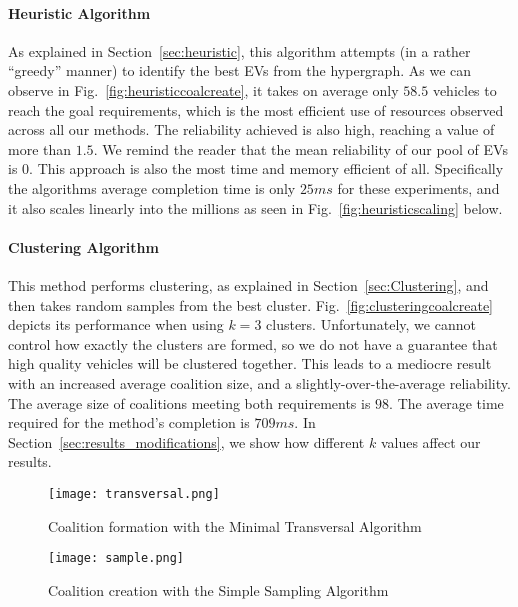 \paragraph{Heuristic Algorithm}
As explained in Section~\ref{sec:heuristic}, this algorithm attempts (in a rather ``greedy'' manner) to identify the best EVs from the hypergraph.	As we can observe in Fig.~\ref{fig:heuristiccoalcreate}, it takes on average only $58.5$ vehicles to reach the goal requirements, which is the most efficient use of resources observed across all our methods. The reliability achieved is also high, reaching a value of more than $1.5$. We remind the reader that the mean reliability of our pool of EVs is $0$. This approach is also the most time and memory efficient of all. Specifically the algorithms average completion time is only $25ms$ for these experiments, and it also scales linearly into the millions as seen in Fig.~\ref{fig:heuristicscaling} below.	
\paragraph{Clustering Algorithm}
This method performs clustering, as explained in Section~\ref{sec:Clustering}, and then takes random samples from the best cluster. Fig.~\ref{fig:clusteringcoalcreate} depicts its performance when using $k=3$ clusters. Unfortunately, we cannot control how exactly the clusters are formed, so we do not have a guarantee that high quality vehicles will be clustered together. This leads to a mediocre result with an increased average coalition size, and a slightly-over-the-average reliability. The average size of coalitions meeting both requirements is $98$. The average time required for the method's completion is $709 ms$. In Section~\ref{sec:results_modifications}, we show how different $k$ values affect our results.
\vspace{-10pt}
\begin{figure}
	\centering
	\begin{minipage}{.5\textwidth}
		\centering
		\texttt{[image: transversal.png]}
		\caption{Coalition formation with the\newline
			Minimal Transversal Algorithm \label{fig:transversalcoalcreate}}
	\end{minipage}%
	\begin{minipage}{.5\textwidth}
		\texttt{[image: sample.png]}
		\caption{Coalition creation with the\newline
			Simple Sampling Algorithm \label{fig:samplecoalcreate}}
	\end{minipage}
\end{figure}
\vspace{-20pt}
